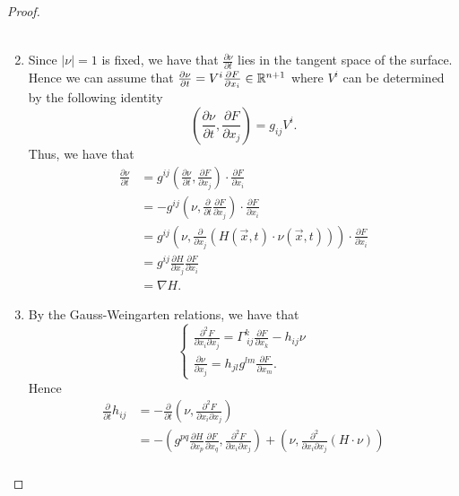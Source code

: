 \begin{proof}
\begin{enumerate}[\normalfont(1)]
\begin{align*}
		      \end{align*}
		\item Since $\left| \nu \right| =1$ is fixed, we have that $\frac{\partial \nu }{\partial t} $ lies in the tangent space of the surface. Hence we can assume that $\frac{\partial \nu }{\partial t} = V^i \frac{\partial F}{\partial x_{i}} \in \mathbb{R}^{n+1}$ where $V^i$ can be determined by the following identity \[\left( \frac{\partial \nu }{\partial t} ,\frac{\partial F}{\partial x_{j}}  \right) = g_{ij}^{} V^i.\] Thus, we have that
		      \begin{equation*}
			      \begin{split}
				      \frac{\partial \nu }{\partial t} &=g_{}^{ij} \left( \frac{\partial \nu }{\partial t} ,\frac{\partial F}{\partial x_{j}}  \right) \cdot \frac{\partial F}{\partial x_{i}} \\
				      &= -g_{}^{ij} \left( \nu  ,\frac{\partial }{\partial t} \frac{\partial F}{\partial x_{j}}  \right) \cdot \frac{\partial F}{\partial x_{i}} \\
				      &= g_{}^{ij} \left( \nu  , \frac{\partial }{\partial x_{j}} (H (\vec{x},t) \cdot \nu (\vec{x},t) ) \right) \cdot \frac{\partial F}{\partial x_{i}} \\
				      &= g_{}^{ij} \frac{\partial H}{\partial x_{j}}  \frac{\partial F}{\partial x_{i}} \\
				      &=\nabla H.
			      \end{split}
		      \end{equation*}
		\item By the Gauss-Weingarten relations, we have that
		      \[
			      \begin{cases}
				      \frac{\partial ^2 F}{\partial x_{i} \partial x_{j}} = \Gamma_{\ ij}^{k} \frac{\partial F}{\partial x_{k}} -h_{ij}^{} \nu \\
				      \frac{\partial \nu }{\partial x_{j}} =h_{jl}^{} g_{}^{lm } \frac{\partial F}{\partial x_{m}} .
			      \end{cases}
		      \]
		      Hence
		      \begin{equation*}
			      \begin{split}
				      \frac{\partial }{\partial t} h_{ij}^{}  &= -\frac{\partial }{\partial t} \left( \nu , \frac{\partial^2 F}{\partial x_{i} \partial x_{j}} \right)  \\
				      &= -\left( g_{}^{pq } \frac{\partial H}{\partial x_{p}}  \frac{\partial F}{\partial x_{q}} , \frac{\partial^2 F}{\partial x_{i} \partial x_{j}}  \right) + \left( \nu , \frac{\partial^2 }{\partial x_{i} \partial x_{j}} (H \cdot \nu ) \right) \\

\end{split}
\end{equation*}
\end{enumerate}
\end{proof}
